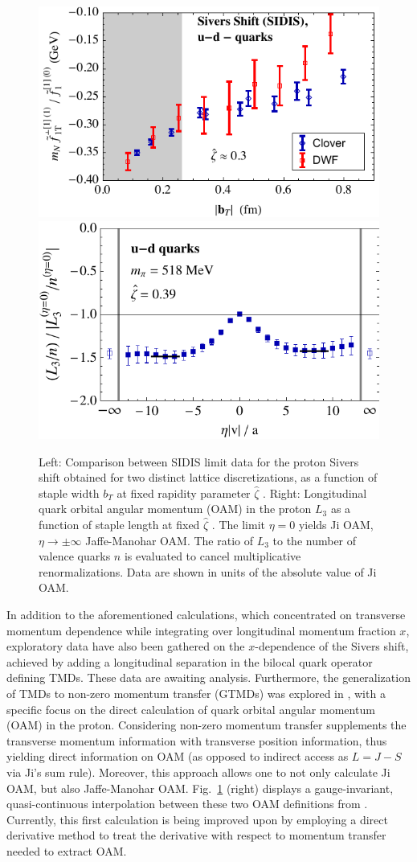 \begin{figure}[h!]
	\centering
	\includegraphics[width=0.462\columnwidth]{figures/UminusD_SiversRat_zetahat-0p35_bdepend_comb}\hspace{1cm}
	\includegraphics[width=0.45\columnwidth]{figures/etaplot_umd_zeta39}
	\caption{Left: Comparison between SIDIS limit data for the proton Sivers
		shift obtained for two distinct lattice discretizations, as a function of
		staple width $b_T $ at fixed rapidity parameter $\hat{\zeta } $
		\cite{Yoon:2017qzo}. Right: Longitudinal quark orbital angular momentum
		(OAM) in the proton $L_3 $ as a function of staple length at fixed
		$\hat{\zeta } $ \cite{Engelhardt:2017miy}. The limit $\eta =0$ yields Ji
		OAM, $\eta \rightarrow \pm \infty $ Jaffe-Manohar OAM. The ratio of $L_3 $
		to the number of valence quarks $n$ is evaluated to cancel multiplicative
		renormalizations. Data are shown in units of the absolute value of Ji OAM.}
	\label{tmd_comp}
\end{figure}


In addition to the aforementioned calculations, which concentrated on
transverse momentum dependence while integrating over longitudinal
momentum fraction $x$, exploratory data have also been gathered on the
$x$-dependence of the Sivers shift, achieved by adding a
longitudinal separation in the bilocal quark operator defining TMDs.
These data are awaiting analysis. Furthermore, the generalization
of TMDs to non-zero momentum transfer (GTMDs) was explored in
\cite{Engelhardt:2017miy}, with a specific focus on the direct
calculation of quark orbital angular momentum (OAM) in the proton.
Considering non-zero momentum transfer supplements the transverse
momentum information with transverse position information, thus
yielding direct information on OAM (as opposed to indirect access
as $L=J-S$ via Ji's sum rule). Moreover, this approach allows one
to not only calculate Ji OAM, but also Jaffe-Manohar OAM.
Fig.~\ref{tmd_comp} (right) displays a gauge-invariant, quasi-continuous
interpolation between these two OAM definitions from \cite{Engelhardt:2017miy}.
Currently, this first calculation is being improved upon by employing a
direct derivative method to treat the derivative with respect to
momentum transfer needed to extract OAM.

